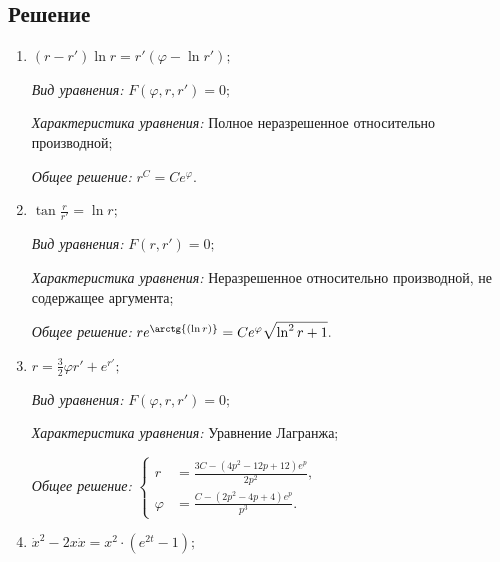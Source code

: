 \documentclass[14pt, a4paper, titlepage, fleqn]{extarticle}
\begin{document}
        \subsection{Решение}
            \begin{enumerate}
                \item \( (r-r') \ln{r} = r' \left( \varphi - \ln{r'} \right); \)
                
                    \textit{Вид уравнения:} \( F \left( \varphi, r, r' \right) = 0; \)

                    \textit{Характеристика уравнения:}
                        Полное неразрешенное относительно производной;

                    \textit{Общее решение:} \( r^C = C e^\varphi. \)

                \item \( \tan{\frac{r}{r'}} = \ln{r}; \)
                
                    \textit{Вид уравнения:} \( F \left(r, r' \right) = 0; \)

                    \textit{Характеристика уравнения:}
                        Неразрешенное относительно производной, не содержащее аргумента;

                    \textit{Общее решение:} \( r e^{\arctg{\left( \ln r \right)}} = C e^\varphi \sqrt{\ln^2{r} + 1}. \)
                

                \item \( r = \frac{3}{2} \varphi r' + e^{r'}; \)
                
                    \textit{Вид уравнения:} \( F \left( \varphi, r, r' \right) = 0; \)

                    \textit{Характеристика уравнения:}
                        Уравнение Лагранжа;

                    \textit{Общее решение:} 
                        \(
                            \left\lbrace
                                \begin{aligned}
                                    r &= \frac{3C - \left(4p^2 - 12p + 12\right) e^p}{2p^2}, \\
                                    \varphi &= \frac{C - \left( 2p^2 - 4p + 4 \right)e^p}{p^3}.
                                \end{aligned}
                            \right.    
                        \)

                \item \( \dot{x}^2 - 2x \dot{x} = x^2 \cdot \left( e^{2t} - 1 \right); \)
                

\end{enumerate}
\end{document}
